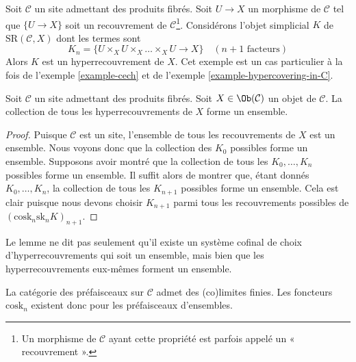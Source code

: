 \begin{example}
\label{example-cech-cover}
Soit $\mathcal{C}$ un site admettant des produits fibrés. Soit $U \to X$ un
morphisme de $\mathcal{C}$ tel que $\{U \to X\}$ soit un recouvrement de
$\mathcal{C}$\footnote{Un morphisme de $\mathcal{C}$ ayant cette propriété
est parfois appelé un « recouvrement ».}. Considérons l'objet simplicial $K$ de
$\text{SR}(\mathcal{C}, X)$ dont les termes sont
$$
K_n = \{U \times_X U \times_X \ldots \times_X U \to X\}
\quad (n + 1 \text{ facteurs})
$$
Alors $K$ est un hyperrecouvrement de $X$. Cet exemple est un cas particulier à la fois de
l'exemple \ref{example-cech} et de
l'exemple \ref{example-hypercovering-in-C}.
\end{example}

\begin{lemma}
\label{lemma-hypercoverings-set}
Soit $\mathcal{C}$ un site admettant des produits fibrés.
Soit $X \in \Ob(\mathcal{C})$ un objet de $\mathcal{C}$.
La collection de tous les hyperrecouvrements de $X$ forme un ensemble.
\end{lemma}

\begin{proof}
Puisque $\mathcal{C}$ est un site, l'ensemble de tous les recouvrements de
$X$ est un ensemble. Nous voyons donc que la collection
des $K_0$ possibles forme un ensemble. Supposons avoir montré que
la collection de tous les $K_0, \ldots, K_n$ possibles forme
un ensemble. Il suffit alors de montrer que, étant donnés
$K_0, \ldots, K_n$, la collection de tous les
$K_{n + 1}$ possibles forme un ensemble. Cela est clair puisque
nous devons choisir $K_{n + 1}$ parmi tous les recouvrements possibles
de $(\text{cosk}_n \text{sk}_n K)_{n + 1}$.
\end{proof}

\begin{remark}
\label{remark-hypercoverings-really-set}
Le lemme ne dit pas seulement qu'il existe un système cofinal
de choix d'hyperrecouvrements qui soit un ensemble,
mais bien que les hyperrecouvrements eux-mêmes forment un ensemble.
\end{remark}

\noindent
La catégorie des préfaisceaux sur $\mathcal{C}$ admet des
(co)limites finies. Les foncteurs $\text{cosk}_n$
existent donc pour les préfaisceaux d'ensembles.

